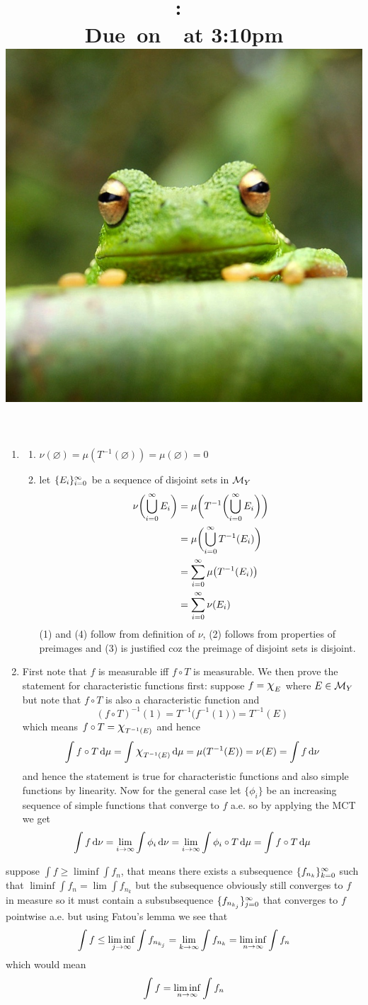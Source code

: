 \documentclass{article}
\title{
    \vspace{2in}
    \textmd{\textbf{\hmwkClass:\ \hmwkTitle}}\\
    \normalsize\vspace{0.1in}\small{Due\ on\ \hmwkDueDate\ at 3:10pm}\\
    \includegraphics[scale=0.2]{frog} \\
    \vspace{0.1in}\large{\textit{\hmwkClassTime}}
    \vspace{3in}
}
\author{\hmwkAuthorName}
\date{}
\begin{document}
\maketitle

\pagebreak 
\begin{homeworkProblem}
    \begin{enumerate}[label=\alph*.]
        \item 
        \begin{enumerate}
            \item $\nu(\varnothing)=\mu(T^{-1}(\varnothing))=\mu(\varnothing)=0$
            \item let $\{E_i\}_{i=0}^\infty$ be a sequence of disjoint sets in $\mathcal{M}_Y$
            \begin{align}
                \nu\biggl(\bigcup_{i=0}^\infty E_i\biggr) &= \mu\biggl(T^{-1}\biggl(\bigcup_{i=0}^\infty E_i\biggr)\biggr) \\
                &= \mu\biggl(\bigcup_{i=0}^\infty T^{-1}(E_i)\biggr) \\
                &= \sum_{i=0}^\infty\mu\big(T^{-1}(E_i)\big) \\
                &= \sum_{i=0}^\infty \nu(E_i)
            \end{align}
            (1) and (4) follow from definition of $\nu$, (2) follows from properties of preimages and (3) is justified coz the preimage of disjoint sets is disjoint.
        \end{enumerate}
        \item First note that $f$ is measurable iff $f\circ T$ is measurable. We then prove the statement for characteristic functions first: suppose $f=\Chi_E$ where $E\in \mathcal{M}_Y$ but note that $f\circ T$ is also a characteristic function and
        \[(f\circ T)^{-1}(1)=T^{-1}\bigl(f^{-1}(1)\bigr)=T^{-1}(E)\]
        which means $f\circ T = \Chi_{T^{-1}(E)}$ and hence
        \[\int f\circ T\dd\mu = \int \Chi_{T^{-1}(E)}\dd\mu = \mu(T^{-1}(E)) = \nu(E) = \int f\dd\nu\]
        and hence the statement is true for characteristic functions and also simple functions by linearity. Now for the general case let $\{\phi_i\}$ be an increasing sequence of simple functions that converge to $f$ a.e. so by applying the MCT we get
        \[\int f\mathop{}\!\mathrm{d}\nu = \lim_{i\to\infty}\int \phi_i\mathop{}\!\mathrm{d}\nu = \lim_{i\to\infty}\int \phi_i\circ T\mathop{}\!\mathrm{d}\mu = \int f\circ T\mathop{}\!\mathrm{d}\mu\]
    \end{enumerate}
\end{homeworkProblem}
\begin{homeworkProblem}[33]
    suppose $\int f\geq \liminf\int f_n$, that means there exists a subsequence $\{f_{n_k}\}_{k=0}^\infty$ such that $\liminf\int f_n=\lim \int f_{n_k}$ but the subsequence obviously still converges to $f$ in measure so it must contain a subsubsequence $\{f_{n_{k_j}}\}_{j=0}^\infty$ that converges to $f$ pointwise a.e. but using Fatou's lemma we see that
    \[
        \int f\leq \liminf_{j\to\infty} \int f_{n_{k_j}} = \lim_{k\to\infty} \int f_{n_k} = \liminf_{n\to\infty} \int f_n
    \]
    which would mean
    \[
        \int f = \liminf_{n\to\infty}\int f_n
    \]
\end{homeworkProblem}
\end{document}
